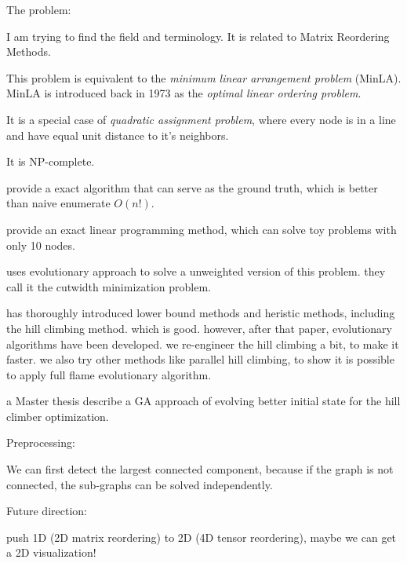 The problem:

I am trying to find the field and terminology.
It is related to Matrix Reordering Methods. \cite{behrisch_matrix_2016}

This problem is equivalent to the \emph{minimum linear arrangement problem} (MinLA). \cite{goos_multi-scale_2002}
MinLA is introduced back in 1973 as the \emph{optimal linear ordering problem}. \cite{adolphson_optimal_1973}

It is a special case of \emph{quadratic assignment problem}, where every node is in a line and have equal unit distance to it's neighbors.

It is NP-complete. \cite{garey_simplified_1976}

\cite{goos_multi-scale_2002} provide a exact algorithm that can serve as the ground truth, which is better than naive enumerate $O(n!)$.

\cite{andrade_minimum_2017} provide an exact linear programming method, which can solve toy problems with only 10 nodes.

\cite{pantrigo_scatter_2012} uses evolutionary approach to solve a unweighted version of this problem. they call it the cutwidth minimization problem.

\cite{petit_experiments_2004} has thoroughly introduced lower bound methods and heristic methods, including the hill climbing method. which is good.
however, after that paper, evolutionary algorithms have been developed.
we re-engineer the hill climbing a bit, to make it faster.
we also try other methods like parallel hill climbing, to show it is possible to apply full flame evolutionary algorithm.

a Master thesis describe a GA approach of evolving better initial state for the hill climber optimization.

Preprocessing:

We can first detect the largest connected component, because if the graph is not connected, the sub-graphs can be solved independently.

Future direction:

push 1D (2D matrix reordering) to 2D (4D tensor reordering), maybe we can get a 2D visualization!
